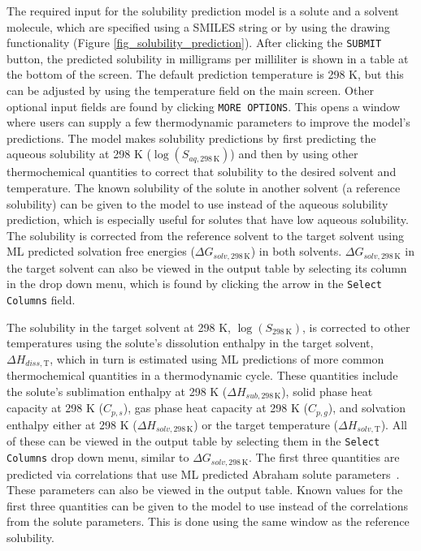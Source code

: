 \documentclass[pdflatex,sn-mathphys-num]{sn-jnl}%
\theoremstyle{thmstyleone}%
\theoremstyle{thmstyletwo}%
\theoremstyle{thmstylethree}%
\begin{document}
The required input for the solubility prediction model is a solute and a solvent molecule, which are specified using a SMILES string or by using the drawing functionality (Figure \ref{fig_solubility_prediction}). After clicking the \texttt{SUBMIT} button, the predicted solubility in milligrams per milliliter is shown in a table at the bottom of the screen. The default prediction temperature is 298 K, but this can be adjusted by using the temperature field on the main screen. 
Other optional input fields are found by clicking \texttt{MORE OPTIONS}. This opens a window where users can supply a few thermodynamic parameters to improve the model's predictions. The model makes solubility predictions by first predicting the aqueous solubility at 298 K ($\log\left(S_{aq, 298\, \mathrm{K}}\right)$) and then by using other thermochemical quantities to correct that solubility to the desired solvent and temperature. The known solubility of the solute in another solvent (a reference solubility) can be given to the model to use instead of the aqueous solubility prediction, which is especially useful for solutes that have low aqueous solubility. The solubility is corrected from the reference solvent to the target solvent using ML predicted solvation free energies ($\Delta G_{solv, 298\, \mathrm{K}}$) in both solvents. $\Delta G_{solv, 298\, \mathrm{K}}$ in the target solvent can also be viewed in the output table by selecting its column in the drop down menu, which is found by clicking the arrow in the \texttt{Select Columns} field. 

The solubility in the target solvent at 298 K, $\log\left(S_{298\, \mathrm{K}}\right)$, is corrected to other temperatures using the solute's dissolution enthalpy in the target solvent, $\Delta H_{diss, \mathrm{T}}$, which in turn is estimated using ML predictions of more common thermochemical quantities in a thermodynamic cycle. These quantities include the solute's sublimation enthalpy at 298 K ($\Delta H_{sub, 298 \,\mathrm{K}}$), solid phase heat capacity at 298 K ($C_{p,s}$), gas phase heat capacity at 298 K ($C_{p,g}$), and solvation enthalpy either at 298 K ($\Delta H_{solv, 298\, \mathrm{K}}$) or the target temperature ($\Delta H_{solv,\mathrm{T}}$). All of these can be viewed in the output table by selecting them in the \texttt{Select Columns} drop down menu, similar to $\Delta G_{solv, 298\, \mathrm{K}}$. The first three quantities are predicted via correlations that use ML predicted Abraham solute parameters~\citep{chung_group_2022}. These parameters can also be viewed in the output table. Known values for the first three quantities can be given to the model to use instead of the correlations from the solute parameters. This is done using the same window as the reference solubility. 
\end{document}
